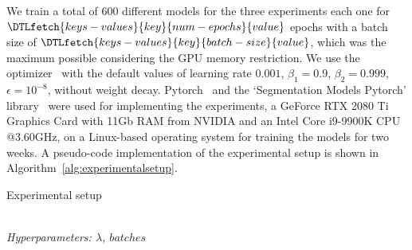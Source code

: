 \documentclass{elsarticle}
\begin{document}
We train a total of $600$ different models for the three experiments each one for $\DTLfetch{keys-values}{key}{num-epochs}{value}$ epochs with a batch size of $\DTLfetch{keys-values}{key}{batch-size}{value}$, which was the maximum possible considering the GPU memory restriction.
We use the optimizer~\cite{kingma2014adam} with the default values of learning rate $0.001$, $\beta_1=0.9$, $\beta_2=0.999$, $\epsilon=10^{-8}$, without weight decay.
Pytorch~\cite{paszke2019pytorch} and the `Segmentation Models Pytorch' library~\cite{yakubovskiy2019segmentation} were used for implementing the experiments, a GeForce RTX 2080 Ti Graphics Card with 11Gb RAM from NVIDIA and an Intel Core i9-9900K CPU @3.60GHz, on a Linux-based operating system for training the models for two weeks.
A pseudo-code implementation of the experimental setup is shown in Algorithm~\ref{alg:experimentalsetup}.

\begin{algorithm}[H]
	\caption{Experimental setup}\label{alg:experimentalsetup}
	\begin{algorithmic}[1]
		\renewcommand{\algorithmicrequire}{\textbf{Input:}}
		\renewcommand{\algorithmicensure}{\textbf{Output:}}
		\\ \textit{Hyperparameters:  $\lambda$, $batches$}
		\ENDFOR{}
		\ENDFOR{}
		\ENDIF{}
		\ENDFOR{}
		\ENDFOR{}
		\ENDFOR{}
		\ENDFOR{}
		\ENDFOR{}
	\end{algorithmic}
\end{algorithm}
\end{document}
